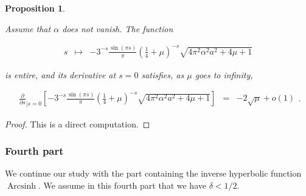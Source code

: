 \documentclass{jams-l}
\newtheorem{proposition}[theorem]{Proposition}
\theoremstyle{definition}
\theoremstyle{remark}
\numberwithin{equation}{section}
\DeclareMathOperator{\arcsinh}{Arcsinh}
\begin{document}
            \begin{proposition}
            \label{PropA3-0}
            
                Assume that $\alpha$ does not vanish. The function
                
                \[ \begin{array}{lll}
                        s & \longmapsto & - 3^{-s} \frac{\sin \left(\pi s \right)}{\pi} \left( \frac{1}{4} + \mu \right)^{-s} \sqrt{4 \pi^2 \alpha^2 a^2 + 4 \mu + 1}
                    \end{array} \]
                
                \noindent is entire, and its derivative at $s=0$ satisfies, as $\mu$ goes to infinity,
                
                \[ \begin{array}{lll}
                        \frac{\partial}{\partial s}_{\left \vert s = 0 \right.} \left[ - 3^{-s} \frac{\sin \left(\pi s \right)}{\pi} \left( \frac{1}{4} + \mu \right)^{-s} \sqrt{4 \pi^2 \alpha^2 a^2 + 4 \mu + 1} \right] & = & - 2 \sqrt{\mu} + o \left( 1 \right)
                    \end{array} . \]
            
            \end{proposition}
            
            \begin{proof}
            
                This is a direct computation.
            
            \end{proof}
            
            
        \subsubsection*{\textbf{Fourth part}}
        \label{AFourthPart}
            
            We continue our study with the part containing the inverse hyperbolic function $\arcsinh$. We assume in this fourth part that we have $\delta < 1/2$.
            
\end{document}
